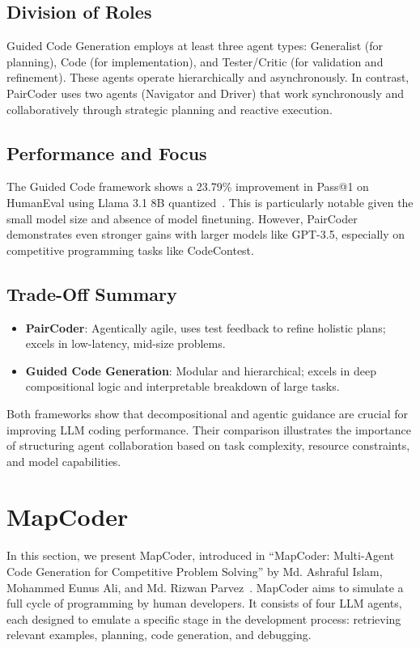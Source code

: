 \documentclass[11pt,a4paper]{article}
\begin{document}
\subsection{Division of Roles}
Guided Code Generation employs at least three agent types: Generalist (for planning), Code (for implementation), and Tester/Critic (for validation and refinement). These agents operate hierarchically and asynchronously. In contrast, PairCoder uses two agents (Navigator and Driver) that work synchronously and collaboratively through strategic planning and reactive execution.

\subsection{Performance and Focus}
The Guided Code framework shows a 23.79\% improvement in Pass@1 on HumanEval using Llama 3.1 8B quantized~\cite{almorsi2025guided}. This is particularly notable given the small model size and absence of model finetuning. However, PairCoder demonstrates even stronger gains with larger models like GPT-3.5, especially on competitive programming tasks like CodeContest.

\subsection{Trade-Off Summary}
\begin{itemize}
\item \textbf{PairCoder}: Agentically agile, uses test feedback to refine holistic plans; excels in low-latency, mid-size problems.
\item \textbf{Guided Code Generation}: Modular and hierarchical; excels in deep compositional logic and interpretable breakdown of large tasks.
\end{itemize}

Both frameworks show that decompositional and agentic guidance are crucial for improving LLM coding performance. Their comparison illustrates the importance of structuring agent collaboration based on task complexity, resource constraints, and model capabilities.

\section{MapCoder}

In this section, we present MapCoder, introduced in ``MapCoder: Multi-Agent Code Generation for Competitive Problem Solving'' by Md. Ashraful Islam, Mohammed Eunus Ali, and Md. Rizwan Parvez~\cite{islam2024mapcodermultiagentcodegeneration}. MapCoder aims to simulate a full cycle of programming by human developers. It consists of four LLM agents, each designed to emulate a specific stage in the development process: retrieving relevant examples, planning, code generation, and debugging.
\end{document}
